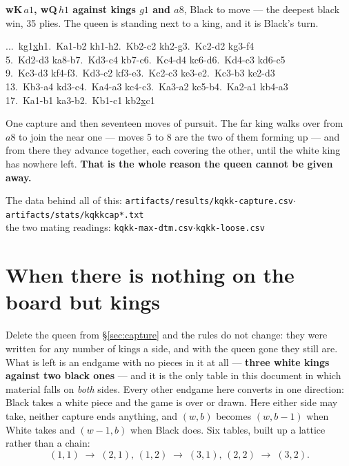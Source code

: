\documentclass[11pt]{article}
\begin{document}
\medskip
\noindent\textbf{wK\,$a1$, wQ\,$h1$ against kings $g1$ and $a8$}, Black to
move --- the deepest black win, 35 plies. The queen is standing next to a king,
and it is Black's turn.

{\small{}...~kg1\underline{x}h1.~Ka1-b2 kh1-h2.~Kb2-c2 kh2-g3.~Kc2-d2 kg3-f4\\
5.~Kd2-d3 ka8-b7.~Kd3-c4 kb7-c6.~Kc4-d4 kc6-d6.~Kd4-c3 kd6-c5\\
9.~Kc3-d3 kf4-f3.~Kd3-c2 kf3-e3.~Kc2-c3 ke3-e2.~Kc3-b3 ke2-d3\\
13.~Kb3-a4 kd3-c4.~Ka4-a3 kc4-c3.~Ka3-a2 kc5-b4.~Ka2-a1 kb4-a3\\
17.~Ka1-b1 ka3-b2.~Kb1-c1 kb2\underline{x}c1
}

\smallskip
\noindent
One capture and then seventeen moves of pursuit. The far king walks over from
$a8$ to join the near one --- moves 5 to 8 are the two of them forming up ---
and from there they advance together, each covering the other, until the white
king has nowhere left. \textbf{That is the whole reason the queen cannot be
given away.}

\begin{center}\small\color{inksoft}
The data behind all of this:\quad
\texttt{artifacts/results/kqkk-capture.csv}\quad$\cdot$\quad
\texttt{artifacts/stats/kqkkcap*.txt}\\
the two mating readings:\quad
\texttt{kqkk-max-dtm.csv}\quad$\cdot$\quad\texttt{kqkk-loose.csv}
\end{center}

\section{When there is nothing on the board but kings}\label{sec:kings}

\noindent
Delete the queen from \S\ref{sec:capture} and the rules do not change: they were
written for any number of kings a side, and with the queen gone they still are.
What is left is an endgame with no pieces in it at all --- \textbf{three white
kings against two black ones} --- and it is the only table in this document in
which material falls on \emph{both} sides. Every other endgame here converts in
one direction: Black takes a white piece and the game is over or drawn. Here
either side may take, neither capture ends anything, and $(w,b)$ becomes
$(w,b-1)$ when White takes and $(w-1,b)$ when Black does. Six tables, built up a
lattice rather than a chain:
\[
  (1,1) \;\longrightarrow\; (2,1),\,(1,2) \;\longrightarrow\; (3,1),\,(2,2)
        \;\longrightarrow\; (3,2).
\]
\end{document}
